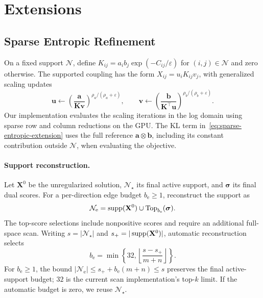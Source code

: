 



\section{Extensions}
\label{app:extensions-details}

\subsection{Sparse Entropic Refinement}
\label{app:entropic-extension}

On a fixed support $\mathcal{N}$, define $K_{ij}=a_i b_j\exp(-C_{ij}/\varepsilon)$ for $(i,j)\in\mathcal{N}$ and zero otherwise.
The supported coupling has the form $X_{ij}=u_iK_{ij}v_j$, with generalized scaling updates
\begin{equation*}
\mathbf{u}\leftarrow\left(\frac{\mathbf{a}}{\mathbf{K}\mathbf{v}}\right)^{\rho_a/(\rho_a+\varepsilon)},\qquad
\mathbf{v}\leftarrow\left(\frac{\mathbf{b}}{\mathbf{K}^\top \mathbf{u}}\right)^{\rho_b/(\rho_b+\varepsilon)}.
\end{equation*}
Our implementation evaluates the scaling iterations in the log domain using sparse row and column reductions on the GPU.
The KL term in~\eqref{eq:sparse-entropic-extension} uses the full reference $\mathbf{a}\otimes \mathbf{b}$, including its constant contribution outside $\mathcal{N}$, when evaluating the objective.

\paragraph{Support reconstruction.}
Let $\mathbf X^0$ be the unregularized solution, $\mathcal N_\star$ its final active support, and $\boldsymbol\sigma$ its final dual scores.
For a per-direction edge budget $b_{\mathrm e}\geq1$, reconstruct the support as
\begin{equation*}
\mathcal N_{\mathrm e}=\operatorname{supp}(\mathbf{X}^0)\cup\operatorname{Top}_{b_{\mathrm e}}(\boldsymbol{\sigma}).
\end{equation*}
The top-score selections include nonpositive scores and require an additional full-space scan.
Writing $s=|\mathcal N_\star|$ and $s_+=|\operatorname{supp}(\mathbf X^0)|$, automatic reconstruction selects
\begin{equation*}
b_{\mathrm e}=\min\left\{32,\left\lfloor\frac{s-s_+}{m+n}\right\rfloor\right\}.
\end{equation*}
For $b_{\mathrm e}\geq1$, the bound $|\mathcal N_{\mathrm e}|\leq s_++b_{\mathrm e}(m+n)\leq s$ preserves the final active-support budget; $32$ is the current scan implementation's top-$k$ limit.
If the automatic budget is zero, we reuse $\mathcal N_\star$.

